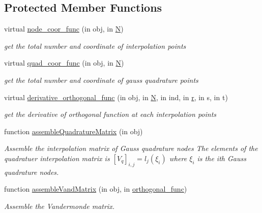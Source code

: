 \subsection*{Protected Member Functions}
\begin{DoxyCompactItemize}
\item 
virtual \hyperlink{class_std_cell_add316f614f245103364929d7ef396842}{node\+\_\+coor\+\_\+func} (in obj, in \hyperlink{class_std_cell_a8df35ad5169af36d3dff62644f7878c9}{N})
\begin{DoxyCompactList}\small\item\em get the total number and coordinate of interpolation points \end{DoxyCompactList}\item 
virtual \hyperlink{class_std_cell_a8652814453f07200e971d4842a6ab8d1}{quad\+\_\+coor\+\_\+func} (in obj, in \hyperlink{class_std_cell_a8df35ad5169af36d3dff62644f7878c9}{N})
\begin{DoxyCompactList}\small\item\em get the total number and coordinate of gauss quadrature points \end{DoxyCompactList}\item 
virtual \hyperlink{class_std_cell_aea66347845cd8a1c4529bf6b4e32c481}{derivative\+\_\+orthogonal\+\_\+func} (in obj, in \hyperlink{class_std_cell_a8df35ad5169af36d3dff62644f7878c9}{N}, in ind, in \hyperlink{class_std_cell_a737dd2feb25f74be0215a594334ec622}{r}, in s, in t)
\begin{DoxyCompactList}\small\item\em get the derivative of orthogonal function at each interpolation points \end{DoxyCompactList}\item 
function \hyperlink{class_std_cell_a7475980133380f0ea35aaa607e65c4a4}{assemble\+Quadrature\+Matrix} (in obj)
\begin{DoxyCompactList}\small\item\em Assemble the interpolation matrix of Gauss quadrature nodes The elements of the quadratuer interpolation matrix is $ [V_q]_{i,j} = l_j(\xi_i) $ where $ \xi_i $ is the ith Gauss quadrature nodes. \end{DoxyCompactList}\item 
function \hyperlink{class_std_cell_aa04bedad492bec03edb178720fdcfa30}{assemble\+Vand\+Matrix} (in obj, in \hyperlink{class_std_cell_a3bf9f78e246c520bb4e8d2f7847774e7}{orthogonal\+\_\+func})
\begin{DoxyCompactList}\small\item\em Assemble the Vandermonde matrix. \end{DoxyCompactList}\item 

\end{DoxyCompactItemize}
